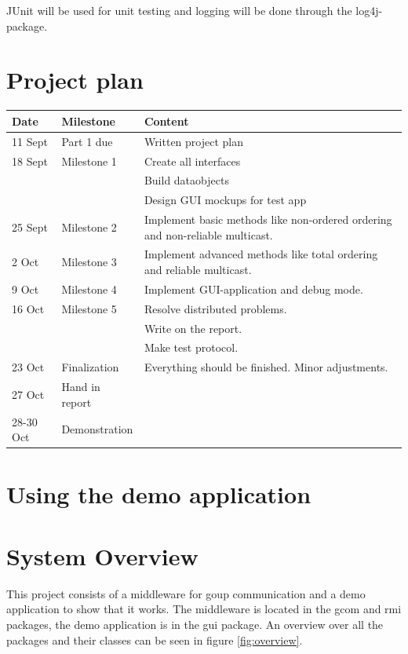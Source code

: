 \documentclass[english]{article}
\begin{document}
JUnit will be used for unit testing and logging will be done through the log4j-package. 

\section{Project plan}
\begin{tabular}{|l|l|p{7.5cm}|}
\hline
Date	&	Milestone	&	Content \\
\hline
11 Sept	&	Part 1 due	&	Written project plan \\
18 Sept &	Milestone 1 &	Create all interfaces \\ 
						&&	Build dataobjects \\
						&&	Design GUI mockups for test app \\
25 Sept &	Milestone 2 & 	Implement basic methods like non-ordered ordering and non-reliable multicast. \\
2 Oct	&	Milestone 3 & 	Implement advanced methods like total ordering and reliable multicast. \\
9 Oct	&	Milestone 4 & 	Implement GUI-application and debug mode. \\
16 Oct	&	Milestone 5 & 	Resolve distributed problems. \\ && Write on the report.\\ && Make test protocol. \\
23 Oct	&	Finalization 	& Everything should be finished. Minor adjustments. \\
27 Oct	&	Hand in report 	& \\
28-30 Oct & Demonstration	& \\
\hline
\end{tabular}


\section{Using the demo application}


\section{System Overview}
This project consists of a middleware for goup communication and a demo application to show that it works. The middleware is located in the gcom and rmi packages, the demo application is in the gui package. An overview over all the packages and their classes can be seen in figure \vref{fig:overview}.
\end{document}
